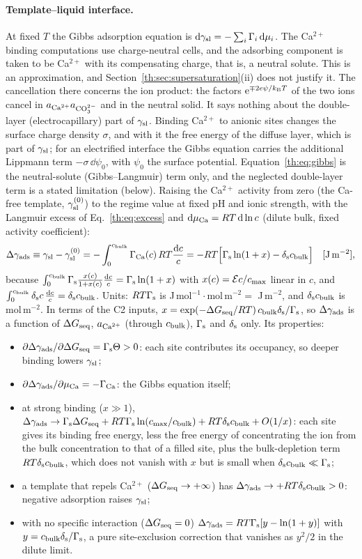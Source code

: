 \paragraph{Template--liquid interface.} At fixed $T$ the Gibbs adsorption equation is
$\mathrm{d}\gamma_\mathrm{sl}=-\sum_i\Gamma_i\,\mathrm{d}\mu_i$. The Ca$^{2+}$ binding computations use charge-neutral cells,
and the adsorbing component is taken to be Ca$^{2+}$ with its compensating charge, that is, a
neutral solute. This is an approximation, and Section~\ref{th:sec:supersaturation}(ii) does not
justify it. The cancellation there concerns the ion product: the factors $\mathrm{e}^{\mp2e\psi/k_\mathrm{B} T}$ of
the two ions cancel in $a_{\mathrm{Ca}^{2+}}a_{\mathrm{CO}_3^{2-}}$ and in the neutral solid. It says nothing about the double-layer
(electrocapillary) part of $\gamma_\mathrm{sl}$. Binding Ca$^{2+}$ to anionic sites changes the surface charge
density $\sigma$, and with it the free energy of the diffuse layer, which is part of $\gamma_\mathrm{sl}$; for an
electrified interface the Gibbs equation carries the additional Lippmann term $-\sigma\,\dd\psi_0$,
with $\psi_0$ the surface potential. Equation~\eqref{th:eq:gibbs} is the neutral-solute
(Gibbs--Langmuir) term only, and the neglected double-layer term is a stated limitation (below).
Raising the Ca$^{2+}$ activity from zero
(the Ca-free template, $\gamma_\mathrm{sl}^{(0)}$) to the regime value at fixed pH and ionic strength, with the
Langmuir excess of Eq.~\eqref{th:eq:excess} and $\mathrm{d}\mu_\mathrm{Ca}=R T\,\mathrm{d}\ln c$ (dilute
bulk, fixed activity coefficient):
\begin{equation}\label{th:eq:gibbs}
\Delta\gamma_\mathrm{ads}\equiv\gamma_\mathrm{sl}-\gamma_\mathrm{sl}^{(0)}=-\int_0^{c_\mathrm{bulk}}\Gamma_\mathrm{Ca}(c)\,R T\frac{\mathrm{d} c}{c}
=-R T\Big[\Gamma_\mathrm{s}\ln(1+x)-\delta_\mathrm{s}c_\mathrm{bulk}\Big] \quad[\mathrm{J\,m^{-2}}],
\end{equation}
because $\int_0^{c_\mathrm{bulk}}\Gamma_\mathrm{s}\frac{x(c)}{1+x(c)}\frac{\mathrm{d} c}{c}=\Gamma_\mathrm{s}\ln(1+x)$ with $x(c)=\mathcal{E} c/c_\mathrm{max}$
linear in $c$, and $\int_0^{c_\mathrm{bulk}}\delta_\mathrm{s} c\,\frac{\mathrm{d} c}{c}=\delta_\mathrm{s}c_\mathrm{bulk}$. Units: $R T\Gamma_\mathrm{s}$ is
J\,mol$^{-1}\cdot$mol\,m$^{-2}=$ J\,m$^{-2}$, and $\delta_\mathrm{s}c_\mathrm{bulk}$ is mol\,m$^{-2}$. In terms of the C2 inputs,
$x=\exp(-\Delta G_\mathrm{seq}/R T)\,c_\mathrm{bulk}\delta_\mathrm{s}/\Gamma_\mathrm{s}$, so $\Delta\gamma_\mathrm{ads}$ is a function of $\Delta G_\mathrm{seq}$, $a_{\mathrm{Ca}^{2+}}$ (through $c_\mathrm{bulk}$),
$\Gamma_\mathrm{s}$ and $\delta_\mathrm{s}$ only. Its properties:
\begin{itemize}
\item $\partial\Delta\gamma_\mathrm{ads}/\partial\Delta G_\mathrm{seq}=\Gamma_\mathrm{s}\Theta>0$: each site contributes its occupancy, so deeper
binding lowers $\gamma_\mathrm{sl}$;
\item $\partial\Delta\gamma_\mathrm{ads}/\partial\mu_\mathrm{Ca}=-\Gamma_\mathrm{Ca}$: the Gibbs equation itself;
\item at strong binding ($x\gg1$), $\Delta\gamma_\mathrm{ads}\to\Gamma_\mathrm{s}\Delta G_\mathrm{seq}+R T\Gamma_\mathrm{s}\ln(c_\mathrm{max}/c_\mathrm{bulk})+R T\delta_\mathrm{s}c_\mathrm{bulk}+O(1/x)$:
each site gives its binding free energy, less the free energy of concentrating the ion from the
bulk concentration to that of a filled site, plus the bulk-depletion term $R T\delta_\mathrm{s}c_\mathrm{bulk}$, which does
not vanish with $x$ but is small when $\delta_\mathrm{s}c_\mathrm{bulk}\ll\Gamma_\mathrm{s}$;
\item a template that repels Ca$^{2+}$ ($\Delta G_\mathrm{seq}\to+\infty$) has $\Delta\gamma_\mathrm{ads}\to+R T\delta_\mathrm{s}c_\mathrm{bulk}>0$: negative
adsorption raises $\gamma_\mathrm{sl}$;
\item with no specific interaction ($\Delta G_\mathrm{seq}=0$) $\Delta\gamma_\mathrm{ads}=R T\Gamma_\mathrm{s}[y-\ln(1+y)]$ with $y=c_\mathrm{bulk}\delta_\mathrm{s}/\Gamma_\mathrm{s}$,
a pure site-exclusion correction that vanishes as $y^{2}/2$ in the dilute limit.
\end{itemize}
